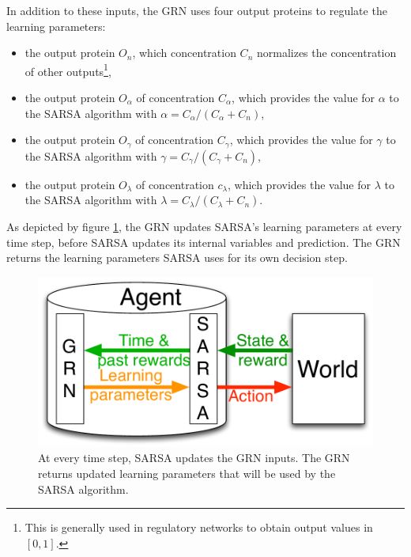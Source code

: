 In addition to these inputs, the GRN uses four output proteins to regulate the learning parameters:
\begin{itemize}
\item the output protein $O_{n}$, which concentration $C_{n}$ normalizes the concentration of other outputs\footnote{This is generally used in regulatory networks to obtain output values in $[0, 1]$.},
\item the output protein $O_{\alpha}$ of concentration $C_{\alpha}$, which provides the value for $\alpha$ to the SARSA algorithm with $\alpha=C_{\alpha}/(C_\alpha+C_{n})$,
\item the output protein $O_\gamma$ of concentration $C_{\gamma}$, which provides the value for $\gamma$ to the SARSA algorithm with $\gamma=C_{\gamma}/(C_\gamma+C_{n})$,
\item the output protein $O_\lambda$ of concentration $c_{\lambda}$, which provides the value for $\lambda$ to the SARSA algorithm with $\lambda=C_{\lambda}/(C_\lambda+C_{n})$.
\end{itemize}

As depicted by figure \ref{fig:GRNSARSA}, the GRN updates SARSA's learning parameters at every time step, before SARSA updates its internal variables and prediction. The GRN returns the learning parameters SARSA uses for its own decision step.

\begin{figure}
\center
\includegraphics[width=0.7\linewidth]{GRNSARSA.pdf}
\caption{At every time step, SARSA updates the GRN inputs. The GRN returns updated learning parameters that will be used by the SARSA algorithm.}\label{fig:GRNSARSA}
\end{figure}

